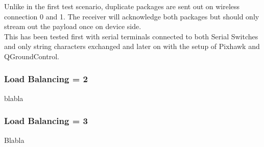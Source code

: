\noindent{}
Unlike in the first test scenario, duplicate packages are sent out on wireless connection 0 and 1. The receiver will acknowledge both packages but should only stream out the payload once on device side.\\
This has been tested first with serial terminals connected to both Serial Switches and only string characters exchanged and later on with the setup of Pixhawk and QGroundControl.
%
%
%
%
%
\subsubsection{Load Balancing = 2}
blabla
%
%
%
%
%
%
\subsubsection{Load Balancing = 3}
Blabla